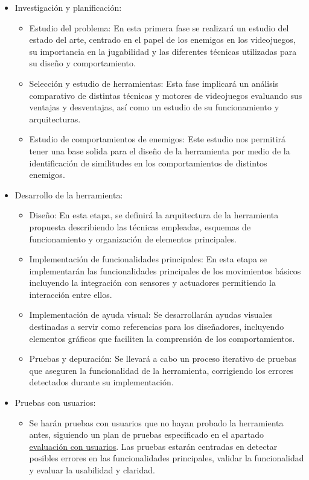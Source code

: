 \begin{itemize}
   \item  Investigación y planificación:
	\begin{itemize}
	    \item  Estudio del problema: En esta primera fase se realizará un estudio del estado del arte, centrado en el papel de los enemigos en los videojuegos, su importancia en la jugabilidad y las diferentes técnicas utilizadas para su diseño y comportamiento.
	    \item Selección y estudio de herramientas: Esta fase implicará un análisis comparativo de distintas técnicas y motores de videojuegos evaluando sus ventajas y desventajas, así como un estudio de su funcionamiento y  arquitecturas.
	    \item Estudio de comportamientos de enemigos: Este estudio nos permitirá tener una base solida para el diseño de la herramienta por medio de la identificación de similitudes en los comportamientos de distintos enemigos. 
	\end{itemize}
   \item Desarrollo de la herramienta: 
	\begin{itemize}
	    \item Diseño: En esta etapa, se definirá la arquitectura de la herramienta propuesta describiendo las técnicas empleadas, esquemas de funcionamiento y organización de elementos principales.
	    \item  Implementación de funcionalidades principales: En esta etapa se implementarán las funcionalidades principales de los movimientos básicos incluyendo la integración con sensores y actuadores permitiendo la interacción entre ellos.
	    \item Implementación de ayuda visual: Se desarrollarán ayudas visuales destinadas a servir como referencias para los diseñadores, incluyendo elementos gráficos que faciliten la comprensión de los comportamientos. 
	    \item Pruebas y depuración: Se llevará a cabo un proceso iterativo de pruebas que aseguren la funcionalidad de la herramienta, corrigiendo los errores detectados durante su implementación.
	\end{itemize}
   \item Pruebas con usuarios:
	\begin{itemize}
	    \item Se harán pruebas con usuarios que no hayan probado la herramienta antes, siguiendo un plan de pruebas especificado en el apartado \hyperref[cap:evaluacionConUsuarios]{evaluación con usuarios}. Las pruebas estarán centradas en detectar posibles errores en las funcionalidades principales, validar la funcionalidad y evaluar la usabilidad y claridad.

\end{itemize}
\end{itemize}
